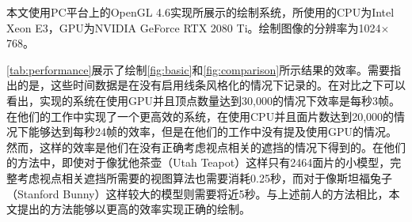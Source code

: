 本文使用PC平台上的OpenGL 4.6实现所展示的\stc{}\vdl{}绘制系统，所使用的CPU为Intel Xeon E3，GPU为NVIDIA GeForce RTX 2080 Ti。绘制图像的分辨率为1024$\times$768。

\autoref{tab:performance}展示了绘制\autoref{fig:basic}和\autoref{fig:comparison}所示结果的效率。需要指出的是，这些时间数据是在没有启用线条风格化的情况下记录的。在对比之下可以看出，\citeauthor{kim2013stereoscopic}实现的系统\cite{kim2013stereoscopic}在使用GPU并且顶点数量达到30,000的情况下效率是每秒3帧。\citeauthor{bukenberger2018stereo}在他们的工作中实现了一个更高效的系统\cite{bukenberger2018stereo}，在使用CPU并且面片数达到20,000的情况下能够达到每秒24帧的效率，但是在他们的工作中没有提及使用GPU的情况。然而，这样的效率是他们在没有正确考虑视点相关的遮挡的情况下得到的。在他们的方法中，即使对于像犹他茶壶（Utah Teapot）这样只有2464面片的小模型，完整考虑视点相关遮挡所需要的视图算法也需要消耗0.25秒，而对于像斯坦福兔子（Stanford Bunny）这样较大的模型则需要将近5秒。与上述前人的方法相比，本文提出的方法能够以更高的效率实现正确的\stc{}\vdl{}绘制。